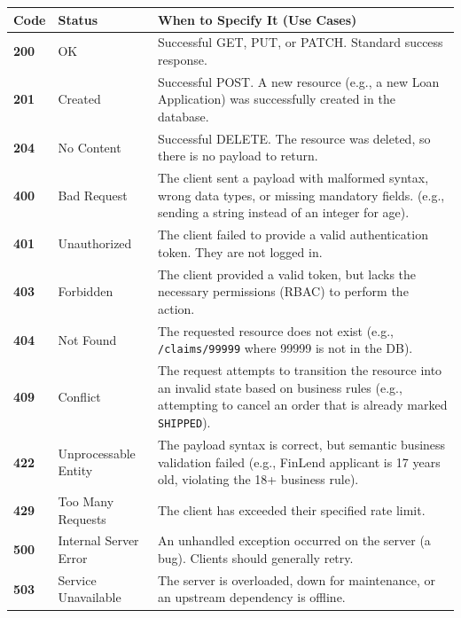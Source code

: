 \documentclass[
  11pt,
  openany,
  oneside]{book}
\begin{document}
\begin{longtable}[]{@{}
  >{\raggedright\arraybackslash}p{}
  >{\raggedright\arraybackslash}p{}
  >{\raggedright\arraybackslash}p{}@{}}
\toprule\noalign{}
\begin{minipage}[b]{\linewidth}\raggedright
Code
\end{minipage} & \begin{minipage}[b]{\linewidth}\raggedright
Status
\end{minipage} & \begin{minipage}[b]{\linewidth}\raggedright
When to Specify It (Use Cases)
\end{minipage} \\
\midrule\noalign{}
\endhead
\bottomrule\noalign{}
\endlastfoot
\textbf{200} & OK & Successful GET, PUT, or PATCH. Standard success
response. \\
\textbf{201} & Created & Successful POST. A new resource (e.g., a new
Loan Application) was successfully created in the database. \\
\textbf{204} & No Content & Successful DELETE. The resource was deleted,
so there is no payload to return. \\
\textbf{400} & Bad Request & The client sent a payload with malformed
syntax, wrong data types, or missing mandatory fields. (e.g., sending a
string instead of an integer for age). \\
\textbf{401} & Unauthorized & The client failed to provide a valid
authentication token. They are not logged in. \\
\textbf{403} & Forbidden & The client provided a valid token, but lacks
the necessary permissions (RBAC) to perform the action. \\
\textbf{404} & Not Found & The requested resource does not exist (e.g.,
\texttt{/claims/99999} where 99999 is not in the DB). \\
\textbf{409} & Conflict & The request attempts to transition the
resource into an invalid state based on business rules (e.g., attempting
to cancel an order that is already marked \texttt{SHIPPED}). \\
\textbf{422} & Unprocessable Entity & The payload syntax is correct, but
semantic business validation failed (e.g., FinLend applicant is 17 years
old, violating the 18+ business rule). \\
\textbf{429} & Too Many Requests & The client has exceeded their
specified rate limit. \\
\textbf{500} & Internal Server Error & An unhandled exception occurred
on the server (a bug). Clients should generally retry. \\
\textbf{503} & Service Unavailable & The server is overloaded, down for
maintenance, or an upstream dependency is offline. \\
\end{longtable}
\end{document}
